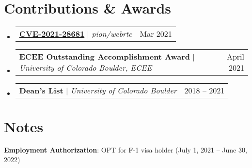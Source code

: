 \documentclass[letterpaper,11pt]{article}
\makeatletter
\newcommand{\resumeProjectHeading}[2]{
    \item
    \begin{tabular*}{0.97\textwidth}{l@{\extracolsep{\fill}}r}
      \small#1 & #2 \\
    \end{tabular*}\vspace{-7pt}
}
\newcommand{\resumeSubHeadingListStart}{\begin{itemize}[leftmargin=0.15in, label={}]}
\newcommand{\resumeSubHeadingListEnd}{\end{itemize}}
\makeatother
\begin{document}
 \vspace{1pt}
\section{Contributions \& Awards}
  \resumeSubHeadingListStart
    \resumeProjectHeading
      {\href{https://cve.mitre.org/cgi-bin/cvename.cgi?name=CVE-2021-28681}{\textbf{CVE-2021-28681}} $|$ \emph{pion/webrtc}}{Mar 2021}
    \resumeProjectHeading
      {\textbf{ECEE Outstanding Accomplishment Award} $|$ \emph{University of Colorado Boulder, ECEE}}{April 2021}
    \resumeProjectHeading
      {\textbf{Dean's List} $|$ \emph{University of Colorado Boulder}}{2018 -- 2021}
  \resumeSubHeadingListEnd

\section{Notes}
 \begin{itemize}[leftmargin=0.15in, label={}]
  \small{\item{
    \textbf{Employment Authorization}{: OPT for F-1 visa holder (July 1, 2021 -- June 30, 2022) } \\
  }}
 \end{itemize}
\end{document}
